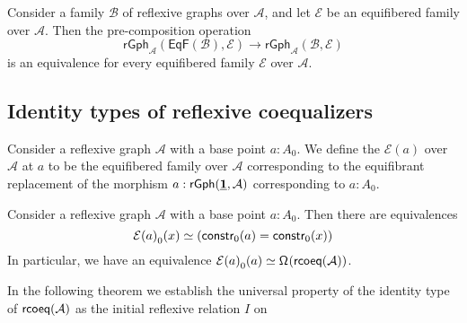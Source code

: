 \begin{thm}\label{thm:eqf_initial}
Consider a family $\mathcal{B}$ of reflexive graphs over $\mathcal{A}$, and let $\mathcal{E}$ be an equifibered family over $\mathcal{A}$. Then the pre-composition operation
\begin{equation*}
\mathsf{rGph}_{\mathcal{A}}(\mathsf{EqF}(\mathcal{B}),\mathcal{E})\to \mathsf{rGph}_{\mathcal{A}}(\mathcal{B},\mathcal{E})
\end{equation*}
is an equivalence for every equifibered family $\mathcal{E}$ over $\mathcal{A}$.
\end{thm}

\subsection{Identity types of reflexive coequalizers}

\begin{defn}
Consider a reflexive graph $\mathcal{A}$ with a base point $a:A_0$. We define the  $\mathcal{E}(a)$ over $\mathcal{A}$ at $a$ to be the equifibered family over $\mathcal{A}$ corresponding to the equifibrant replacement of the morphism $a:\mathsf{rGph}(\underline{\mathbf{1}},\mathcal{A})$ corresponding to $a:A_0$. 
\end{defn}

\begin{thm}
Consider a reflexive graph $\mathcal{A}$ with a base point $a:A_0$. Then there are equivalences
\begin{equation*}
\pts{\mathcal{E}(a)}(x) \eqvsym (\mathsf{constr}_0(a)=\mathsf{constr}_0(x))
\end{equation*}
In particular, we have an equivalence $\eqv{\pts{\mathcal{E}(a)}(a)}{\loopspace{\rcoeq(\mathcal{A})}}$. 
\end{thm}

In the following theorem we establish the universal property of the identity type of $\mathsf{rcoeq}(\mathcal{A})$ as the initial reflexive relation $I$ on 

